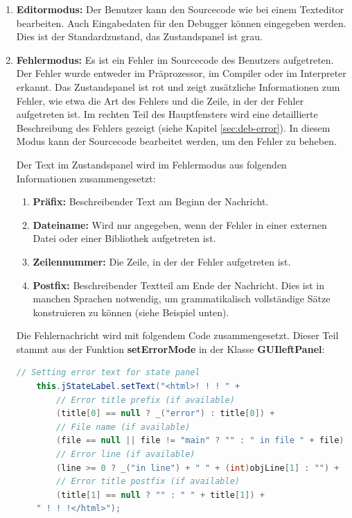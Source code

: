 \begin{enumerate}
\item \textbf{Editormodus:} Der Benutzer kann den Sourcecode wie bei einem Texteditor bearbeiten. Auch Eingabedaten für den Debugger können eingegeben werden. Dies ist der Standardzustand, das Zustandspanel ist grau.
\item \textbf{Fehlermodus:} Es ist ein Fehler im Sourcecode des Benutzers aufgetreten. Der Fehler wurde entweder im Präprozessor, im Compiler oder im Interpreter erkannt. Das Zustandspanel ist rot und zeigt zusätzliche Informationen zum Fehler, wie etwa die Art des Fehlers und die Zeile, in der der Fehler aufgetreten ist. Im rechten Teil des Hauptfensters wird eine detaillierte Beschreibung des Fehlers gezeigt (siehe Kapitel \ref{sec:deb-error}). In diesem Modus kann der Sourcecode bearbeitet werden, um den Fehler zu beheben.

Der Text im Zustandspanel wird im Fehlermodus aus folgenden Informationen zusammengesetzt:
\begin{enumerate}
\item \textbf{Präfix:} Beschreibender Text am Beginn der Nachricht.
\item \textbf{Dateiname:} Wird nur angegeben, wenn der Fehler in einer externen Datei oder einer Bibliothek aufgetreten ist.
\item \textbf{Zeilennummer:} Die Zeile, in der der Fehler aufgetreten ist.
\item \textbf{Postfix:} Beschreibender Textteil am Ende der Nachricht. Dies ist in manchen Sprachen notwendig, um grammatikalisch vollständige Sätze konstruieren zu können (siehe Beispiel unten).
\end{enumerate}

Die Fehlernachricht wird mit folgendem Code zusammengesetzt. Dieser Teil stammt aus der Funktion \textbf{setErrorMode} in der Klasse \textbf{GUIleftPanel}:

\begin{lstlisting}[language=JAVA]
	// Setting error text for state panel
	this.jStateLabel.setText("<html>! ! ! " +
		// Error title prefix (if available)
		(title[0] == null ? _("error") : title[0]) +
		// File name (if available)
		(file == null || file != "main" ? "" : " in file " + file) + " " +
		// Error line (if available)
		(line >= 0 ? _("in line") + " " + (int)objLine[1] : "") +
		// Error title postfix (if available)
		(title[1] == null ? "" : " " + title[1]) +
	" ! ! !</html>");
\end{lstlisting}


\end{enumerate}
